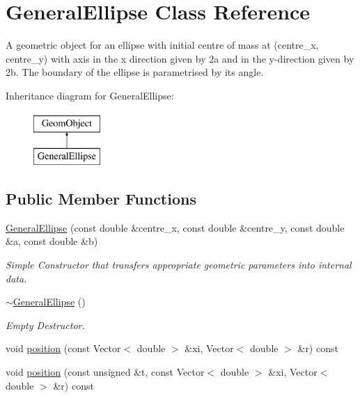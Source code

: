 \hypertarget{classGeneralEllipse}{}\section{General\+Ellipse Class Reference}
\label{classGeneralEllipse}


A geometric object for an ellipse with initial centre of mass at (centre\+\_\+x, centre\+\_\+y) with axis in the x direction given by 2a and in the y-\/direction given by 2b. The boundary of the ellipse is parametrised by its angle.  


Inheritance diagram for General\+Ellipse\+:\begin{figure}[H]
\begin{center}
\leavevmode
\includegraphics[height=2.000000cm]{classGeneralEllipse}
\end{center}
\end{figure}
\subsection*{Public Member Functions}
\begin{DoxyCompactItemize}
\item 
\hyperlink{classGeneralEllipse_a50dc036d709bcd1d53eafb62b5548f67}{General\+Ellipse} (const double \&centre\+\_\+x, const double \&centre\+\_\+y, const double \&a, const double \&b)
\begin{DoxyCompactList}\small\item\em Simple Constructor that transfers appropriate geometric parameters into internal data. \end{DoxyCompactList}\item 
\hyperlink{classGeneralEllipse_a3ac5c17cf8c4998f1b74913860cb3bb9}{$\sim$\+General\+Ellipse} ()
\begin{DoxyCompactList}\small\item\em Empty Destructor. \end{DoxyCompactList}\item 
void \hyperlink{classGeneralEllipse_a85e975c70441a9c9c711b5e27d124bff}{position} (const Vector$<$ double $>$ \&xi, Vector$<$ double $>$ \&r) const
\item 
void \hyperlink{classGeneralEllipse_a2bdcc69fcb1f1725124d625c032d171a}{position} (const unsigned \&t, const Vector$<$ double $>$ \&xi, Vector$<$ double $>$ \&r) const
\end{DoxyCompactItemize}
